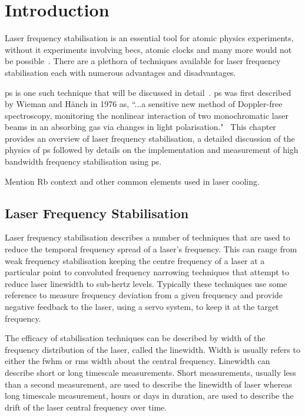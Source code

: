\chapter{Introduction}

Laser frequency stabilisation is an essential tool for atomic physics experiments, without it experiments involving \glspl{bec}, atomic clocks and many more would not be possible~\cite{anderson_observation_1995,ye_quantum_2008}.
There are a plethora of techniques available for laser frequency stabilisation each with numerous advantages and disadvantages.

\Gls{ps} is one such technique that will be discussed in detail~\cite{demtroder_laser_2003}.
\Gls{ps} was first described by Wieman and H\"anch in 1976 as, ``...a sensitive new method of Doppler-free spectroscopy, monitoring the nonlinear interaction of two monochromatic laser beams in an absorbing gas via changes in light polarisation."~\cite{wieman_doppler-free_1976}
This chapter provides an overview of laser frequency stabilisation, a detailed discussion of the physics of \gls{ps} followed by details on the implementation and measurement of high bandwidth frequency stabilisation using \gls{ps}.

{\color{red} Mention Rb context and other common elements used in laser cooling.}

\section{Laser Frequency Stabilisation}

Laser frequency stabilisation describes a number of techniques that are used to reduce the temporal frequency spread of a laser's frequency.
This can range from weak frequency stabilisation keeping the centre frequency of a laser at a particular point to convoluted frequency narrowing techniques that attempt to reduce laser linewidth to sub-hertz levels.
Typically these techniques use some reference to measure frequency deviation from a given frequency and provide negative feedback to the laser, using a servo system, to keep it at the target frequency.

The efficacy of stabilisation techniques can be described by width of the frequency distribution of the laser, called the linewidth.
Width is usually refers to either the \gls{fwhm} or \gls{rms} width about the central frequency.
Linewidth can describe short or long timescale measurements.
Short measurements, usually less than a second measurement, are used to describe the linewidth of laser whereas long timescale measurement, hours or days in duration, are used to describe the drift of the laser central frequency over time.

